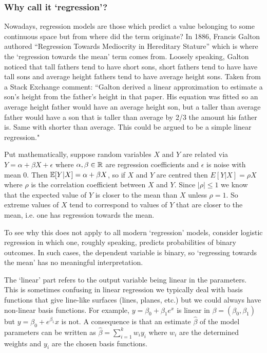 \documentclass[11pt]{article}
\begin{document}
\subsubsection{Why call it `regression'?}
Nowadays, regression models are those which predict a value belonging to some continuous space but from where did the term originate? In 1886, Francis Galton authored ``Regression Towards Mediocrity in Hereditary Stature'' which is where the `regression towards the mean' term comes from. Loosely speaking, Galton noticed that tall fathers tend to have short sons, short fathers tend to have have tall sons and average height fathers tend to have average height sons. Taken from a Stack Exchange comment: ``Galton derived a linear approximation to estimate a son's height from the father's height in that paper. His equation was fitted so an average height father would have an average height son, but a taller than average father would have a son that is taller than average by 2/3 the amount his father is. Same with shorter than average. This could be argued to be a simple linear regression."

Put mathematically, suppose random variables $X$ and $Y$ are related via $Y=\alpha+\beta X+\epsilon$ where $\alpha,\beta\in\mathbb{R}$ are regression coefficients and $\epsilon$ is noise with mean $0$. Then $\mathbb{E}[Y|X]=\alpha+\beta X$, so if $X$ and $Y$ are centred then $E[Y|X]=\rho X$ where $\rho$ is the correlation coefficient between $X$ and $Y$. Since $|\rho|\leq1$ we know that the expected value of $Y$ is closer to the mean than $X$ unless $\rho=1$. So extreme values of $X$ tend to correspond to values of $Y$ that are closer to the mean, i.e. one has regression towards the mean.

To see why this does not apply to all modern `regression' models, consider logistic regression in which one, roughly speaking, predicts probabilities of binary outcomes. In such cases, the dependent variable is binary, so `regressing towards the mean' has no meaningful interpretation.

The `linear' part refers to the output variable being linear in the parameters. This is sometimes confusing in linear regression we typically deal with basis functions that give line-like surfaces (lines, planes, etc.) but we could always have non-linear basis functions. For example, $y=\beta_0+\beta_1 e^x$ is linear in $\beta=(\beta_0,\beta_1)$ but $y=\beta_0+e^{\beta_1}x$ is not. A consequence is that an estimate $\hat{\beta}$ of the model parameters can be written as $\hat{\beta}=\sum_{i=1}^k w_iy_i$ where $w_i$ are the determined weights and $y_i$ are the chosen basis functions.
\end{document}
